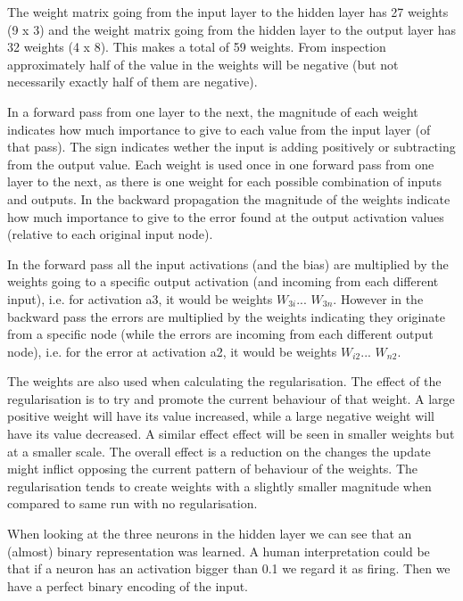 \documentclass[a4paper]{article}
\begin{document}
The weight matrix going from the input layer to the hidden layer has 27 weights (9 x 3) and the weight matrix going from the hidden layer to the output layer has 32 weights (4 x 8). This makes a total of 59 weights. From inspection approximately half of the value in the weights will be negative (but not necessarily exactly half of them are negative).

In a forward pass from one layer to the next, the magnitude of each weight indicates how much importance to give to each value from the input layer (of that pass). The sign indicates wether the input is adding positively or subtracting from the output value. Each weight is used once in one forward pass from one layer to the next, as there is one weight for each possible combination of inputs and outputs. In the backward propagation the magnitude of the weights indicate how much importance to give to the error found at the output activation values (relative to each original input node). 

In the forward pass all the input activations (and the bias) are multiplied by the weights going to a specific output activation (and incoming from each different input), i.e. for activation a3, it would be weights $W_{3i}$... $W_{3n}$. However in the backward pass the errors are multiplied by the weights indicating they originate from a specific node (while the errors are incoming from each different output node), i.e. for the error at activation a2, it would be weights $W_{i2}$... $W_{n2}$. 

The weights are also used when calculating the regularisation. The effect of the regularisation is to try and promote the current behaviour of that weight. A large positive weight will have its value increased, while a large negative weight will have its value decreased. A similar effect effect will be seen in smaller weights but at a smaller scale. The overall effect is a reduction on the changes the update might inflict opposing the current pattern of behaviour of the weights. The regularisation tends to create weights with a slightly smaller magnitude when compared to same run with no regularisation.

When looking at the three neurons in the hidden layer we can see that an (almost) binary representation was learned. A human interpretation could be that if a neuron has an activation bigger than 0.1 we regard it as firing. Then we have a perfect binary encoding of the input.
\end{document}
